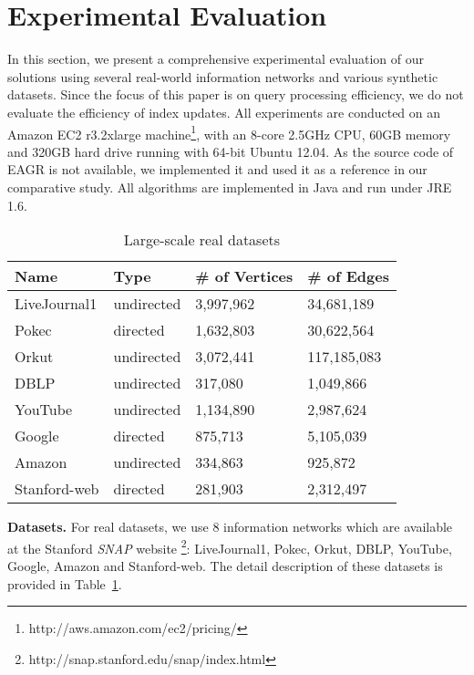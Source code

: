 \section{Experimental Evaluation}\label{sec:experiments}
In this section, we present a comprehensive experimental evaluation 
of our solutions using several real-world information networks and 
various synthetic datasets. Since the focus of this paper is on query processing efficiency, 
we do not evaluate the efficiency of index updates. 
All experiments are conducted on an 
Amazon EC2 r3.2xlarge machine\footnote{http://aws.amazon.com/ec2/pricing/}, 
with an 8-core 2.5GHz CPU, 60GB memory and 320GB hard drive 
running with 64-bit Ubuntu 12.04. As the source code of EAGR is not
available, we implemented it and used it as a reference in our comparative
study.  
All algorithms are implemented in Java and run under JRE 1.6.

\begin{table}[h]
\centering
\begin{tabular}{|l|l|l|l|}
\hline 
\rule[-1ex]{0pt}{2.5ex} Name & Type & \# of Vertices & \# of Edges \\ 
\hline 
\rule[-1ex]{0pt}{2.5ex} LiveJournal1 & undirected & 3,997,962 & 34,681,189 \\ 
\hline 
\rule[-1ex]{0pt}{2.5ex} Pokec & directed & 1,632,803 & 30,622,564 \\ 
\hline 
\rule[-1ex]{0pt}{2.5ex} Orkut & undirected & 3,072,441 & 117,185,083 \\ 
\hline 
\rule[-1ex]{0pt}{2.5ex} DBLP & undirected & 317,080 & 1,049,866 \\ 
\hline 
\rule[-1ex]{0pt}{2.5ex} YouTube & undirected & 1,134,890 & 2,987,624 \\ 
\hline 
\rule[-1ex]{0pt}{2.5ex} Google & directed & 875,713 & 5,105,039 \\ 
\hline 
\rule[-1ex]{0pt}{2.5ex} Amazon & undirected & 334,863 & 925,872 \\ 
\hline 
\rule[-1ex]{0pt}{2.5ex} Stanford-web & directed & 281,903 &  2,312,497 \\ 
\hline 
\end{tabular}
\caption{Large-scale real datasets}
\label{tab:realdata}
\end{table}


\textbf{Datasets.} For real datasets, we use 8 information networks 
which are available at the Stanford \emph{SNAP} 
website \footnote{http://snap.stanford.edu/snap/index.html}: 
LiveJournal1, Pokec, Orkut, DBLP, YouTube, Google, Amazon and Stanford-web. 
The detail description of these datasets is provided in 
Table~\ref{tab:realdata}. 

